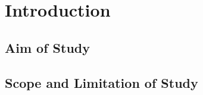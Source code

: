 \chapter{Introduction}
\label{chap:introduction}

\lipsum[1]

\section{Aim of Study}

\lipsum[1]

\section{Scope and Limitation of Study}

\lipsum[1]